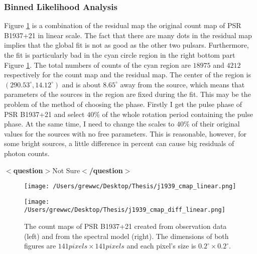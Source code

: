 \documentclass[12pt]{report}
\newcommand{\question}[1]{
  $<$\textbf{question}$>$#1$<$\textbf{/question}$>$
}
\begin{document}
        \subsubsection{Binned Likelihood Analysis}
          Figure \ref{fig: j1939_count_map_diff} is a combination of the residual map the 
          original count map of PSR B1937+21 in linear scale. The fact that there are many 
          dots in the residual map implies that the global fit is not as good as the 
          other two pulsars. Furthermore, the fit is particularly bad in the cyan circle 
          region in the right bottom part Figure \ref{fig: j1939_count_map_diff}. 
          The total numbers of counts of the cyan region are $18975$ and $4212$ respectively 
          for the count map and the residual map. The center of the region is 
          $\left(290.53^{\circ}, 14.12^{\circ}\right)$ and is about $8.65^{\circ}$ away from 
          the source, which means that parameters of the sources in the region are fixed 
          during the fit. This may be the problem of the method of choosing the phase. 
          Firstly I get the pulse phase of PSR B1937+21 and select $40\%$ of the whole 
          rotation period containing the pulse phase. At the same time, I need to change the 
          scales to $40\%$ of their original values for the sources with no free 
          parameters. This is reasonable, however, for some bright sources, a little 
          difference in percent can cause big residuals of photon counts. 
          \question{Not Sure}

          \begin{figure}[!ht]
            \begin{center}
            \begin{minipage}{0.45\textwidth}
              \begin{center} 
                \texttt{[image: /Users/grewwc/Desktop/Thesis/j1939\_cmap\_linear.png]}
              \end{center}
            \end{minipage}
            \begin{minipage}{0.45\textwidth}
              \begin{center}
                \texttt{[image: /Users/grewwc/Desktop/Thesis/j1939\_cmap\_diff\_linear.png]}
              \end{center}
            \end{minipage}
            \end{center}

            \caption{The count maps of PSR B1937+21 created from observation 
              data (left) and from the spectral model (right). The dimensions
              of both figures are $141 pixels \times 141 pixels$ and each pixel's size is
              $0.2^{\circ}\times0.2^{\circ}$.}
            \label{fig: j1939_count_map_diff}
          \end{figure}
\end{document}
